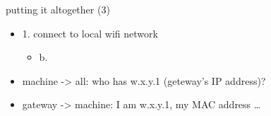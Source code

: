 \begin{frame}{putting it altogether (3)}
    \begin{itemize}
    \item 1. connect to local wifi network
        \begin{itemize}
        \item b. 
        \end{itemize}
    \vspace{.5cm}
    \item<2-> machine -> all: who has w.x.y.1 (geteway's IP address)?
    \item<2-> gateway -> machine: I am w.x.y.1, my MAC address \ldots
    \end{itemize}
\end{frame}

\begin{comment}
\begin{frame}{putting it altogether (4')}
    \begin{itemize}
    \item 2. \myemph<2-3>{open http://foo.com/bar in web browser}
        \begin{itemize}
        \item a. \myemph<2>{lookup foo.com}
        \end{itemize}
    \end{itemize}
\begin{tikzpicture}
\matrix[draw, ultra thick,label={[label distance=-5mm,draw,fill=white]north:wifi frame}] {
    \node {from: (machine MAC address) | to: (gateway MAC address)}; \\
    \matrix[very thick,draw,label={[label distance=-5mm,draw,fill=white]north:IP packet}] {
        \node {from: (machine IP address) | to: (machine MAC address)}; \\
        \matrix[very thick, draw, label={[label distance=-5mm,draw,fill=white]north:UDP datagram}] {
            \node {destination port: 53 (DNS) | message: foo.com address = ???};
        };
    }; \\
};
\end{tikzpicture}
\end{frame}
\end{comment}

